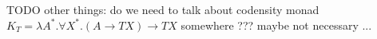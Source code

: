 


TODO other things: do we need to talk about codensity monad
$K_T = \lambda A^{*}.\forall X^{*}.(A \to T X) \to T X$
somewhere ??? maybe not necessary ...


